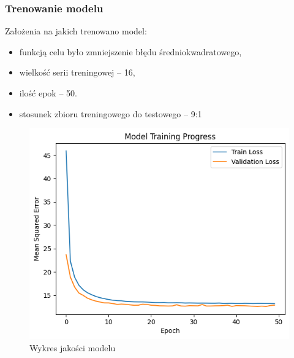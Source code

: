 \documentclass[usepdftitle=false,24pt]{beamer}
\begin{document}
\begin{frame}
    \frametitle{Trenowanie modelu}

    Założenia na jakich trenowano model:
    \begin{itemize}
        \item funkcją celu było zmniejszenie błędu średniokwadratowego,
        \item wielkość serii treningowej -- 16,
        \item ilość epok -- 50.
        \item stosunek zbioru treningowego do testowego -- 9:1
    \end{itemize}


    \begin{figure}
        \includegraphics[width=.6\textwidth]{images/TestVsValidation.png}
        \caption{Wykres jakości modelu}
    \end{figure}

\end{frame}
\end{document}
